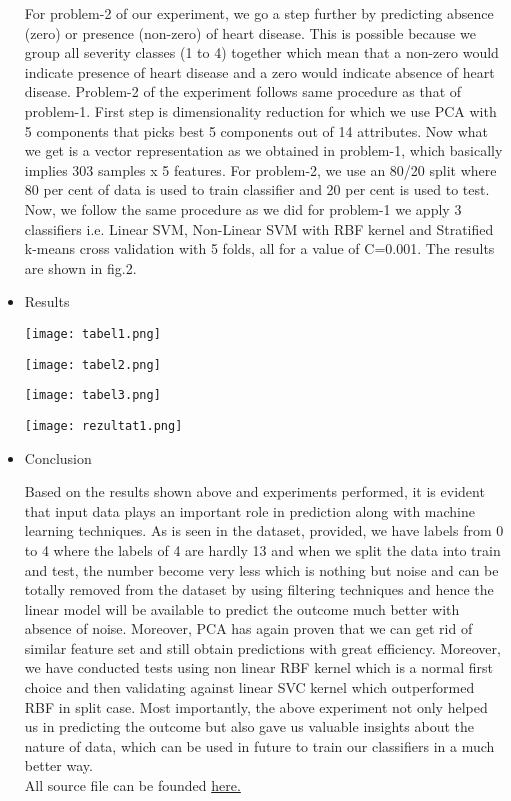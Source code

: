 \begin{itemize}
\tab For problem-2 of our experiment, we go a step further by predicting absence (zero) or presence (non-zero) of heart disease. This is possible because we group all severity classes (1 to 4) together which mean that a non-zero would indicate presence of heart disease and a zero would indicate absence of heart disease. Problem-2 of the experiment follows same procedure as that of problem-1. First step is dimensionality reduction for which we use PCA with 5 components that picks best 5 components out of 14 attributes. Now what we get is a vector representation as we obtained in problem-1, which basically implies 303 samples x 5 features. For problem-2, we use an 80/20 split where 80 per cent of data is used to train classifier and 20 per cent is used to test. Now, we follow the same procedure as we did for problem-1 we apply 3 classifiers i.e. Linear SVM, Non-Linear SVM with RBF kernel and Stratified k-means cross validation with 5 folds, all for a value of C=0.001. The results are shown in fig.2. \\

\item{Results}

\begin{center}
  	\texttt{[image: tabel1.png]}
\end{center}

\begin{center}
  	\texttt{[image: tabel2.png]}
\end{center}

\begin{center}
  	\texttt{[image: tabel3.png]}
\end{center}

\begin{center}
  	\texttt{[image: rezultat1.png]}
\end{center}

\item{Conclusion}

\tab Based on the results shown above and experiments performed, it is evident that input data plays an important role in prediction along with machine learning techniques. As is seen in the dataset, provided, we have labels from 0 to 4 where the labels of 4 are hardly 13 and when we split the data into train and test, the number become very less which is nothing but noise and can be totally removed from the dataset by using filtering techniques and hence the linear model will be available to predict the outcome much better with absence of noise. Moreover, PCA has again proven that we can get rid of similar feature set and still obtain predictions with great efficiency. Moreover, we have conducted tests using non linear RBF kernel which is a normal first choice and then validating against linear SVC kernel which outperformed RBF in split case. Most importantly, the above experiment not only helped us in predicting the outcome but also gave us valuable insights about the nature of data, which can be used in future to train our classifiers in a much better way. \\

\tab All source file can be founded  \href{https://github.com/diwakar02/Heart-Disease-Prediction-using-Machine-Leaning}{here.}\\

\end{itemize}
